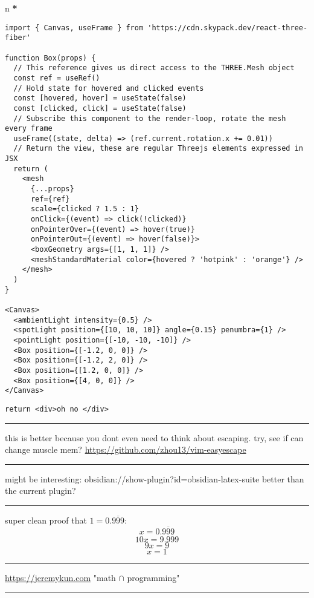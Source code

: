 \documentclass[letterpaper]{article}
\date{\today}
\title{}
\renewcommand{\tableofcontents}{}
\begin{document}
\tableofcontents

n \textbf{*}

\begin{verbatim}
import { Canvas, useFrame } from 'https://cdn.skypack.dev/react-three-fiber'

function Box(props) {
  // This reference gives us direct access to the THREE.Mesh object
  const ref = useRef()
  // Hold state for hovered and clicked events
  const [hovered, hover] = useState(false)
  const [clicked, click] = useState(false)
  // Subscribe this component to the render-loop, rotate the mesh every frame
  useFrame((state, delta) => (ref.current.rotation.x += 0.01))
  // Return the view, these are regular Threejs elements expressed in JSX
  return (
    <mesh
      {...props}
      ref={ref}
      scale={clicked ? 1.5 : 1}
      onClick={(event) => click(!clicked)}
      onPointerOver={(event) => hover(true)}
      onPointerOut={(event) => hover(false)}>
      <boxGeometry args={[1, 1, 1]} />
      <meshStandardMaterial color={hovered ? 'hotpink' : 'orange'} />
    </mesh>
  )
}

<Canvas>
  <ambientLight intensity={0.5} />
  <spotLight position={[10, 10, 10]} angle={0.15} penumbra={1} />
  <pointLight position={[-10, -10, -10]} />
  <Box position={[-1.2, 0, 0]} />
  <Box position={[-1.2, 2, 0]} />
  <Box position={[1.2, 0, 0]} />
  <Box position={[4, 0, 0]} />
</Canvas>
\end{verbatim}

\begin{verbatim}
return <div>oh no </div>
\end{verbatim}

\noindent\rule{\textwidth}{0.5pt}

this is better because you dont even need to think about escaping. try,
see if can change muscle mem? \url{https://github.com/zhou13/vim-easyescape}

\noindent\rule{\textwidth}{0.5pt}

might be interesting: obsidian://show-plugin?id=obsidian-latex-suite
better than the current plugin?

\noindent\rule{\textwidth}{0.5pt}

super clean proof that \(1 = 0. \overline{999}\):
\[x = 0.\overline{999}\] \[10x = 9.\overline{999}\] \[9x = 9\] \[x = 1\]

\noindent\rule{\textwidth}{0.5pt}

\url{https://jeremykun.com} "math \(\cap\) programming"

\noindent\rule{\textwidth}{0.5pt}
\end{document}
